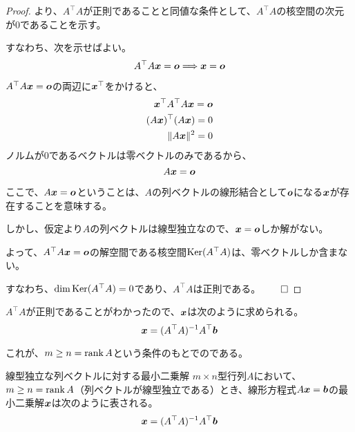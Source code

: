 \documentclass[../../../topic_linear-algebra]{subfiles}
\begin{document}
\begin{proof}
  より、$A^\top A$が正則であることと同値な条件として、$A^\top A$の核空間の次元が0であることを示す。
  
  すなわち、次を示せばよい。
  \begin{equation*}
    A^\top A \vb*{x} = \vb*{o} \Longrightarrow \vb*{x} = \vb*{o}
  \end{equation*}
  
  $A^\top A \vb*{x} = \vb*{o}$の両辺に$\vb*{x}^\top$をかけると、
  \begin{align*}
    \vb*{x}^\top A^\top A \vb*{x} = \vb*{o} \\
    (A \vb*{x})^\top (A \vb*{x}) = 0 \\
    \| A \vb*{x} \|^2 = 0
  \end{align*}
  ノルムが0であるベクトルは零ベクトルのみであるから、
  \begin{equation*}
    A \vb*{x} = \vb*{o}
  \end{equation*}
  
  ここで、$A \vb*{x} = \vb*{o}$ということは、$A$の列ベクトルの線形結合として$\vb*{o}$になる$\vb*{x}$が存在することを意味する。
  
  しかし、仮定より$A$の列ベクトルは線型独立なので、$\vb*{x} = \vb*{o}$しか解がない。
  
  \br
  
  よって、$A^\top A \vb*{x} = \vb*{o}$の解空間である核空間$\operatorname{Ker}(A^\top A)$は、零ベクトルしか含まない。

  すなわち、$\dim \operatorname{Ker}(A^\top A) = 0$であり、$A^\top A$は正則である。$\qed$
\end{proof}

\br

$A^\top A$が正則であることがわかったので、$\vb*{x}$は次のように求められる。
\begin{equation*}
  \vb*{x} = (A^\top A)^{-1}A^\top \vb*{b}
\end{equation*}

これが、$m \geq n = \rank A$という条件のもとでのである。

\begin{theorem*}{線型独立な列ベクトルに対する最小二乗解}
  $m \times n$型行列$A$において、$m \geq n = \rank A$（列ベクトルが線型独立である）とき、線形方程式$A\vb*{x} = \vb*{b}$の最小二乗解$\vb*{x}$は次のように表される。
  \begin{equation*}
    \vb*{x} = (A^\top A)^{-1}A^\top \vb*{b}
  \end{equation*}
\end{theorem*}
\end{document}
